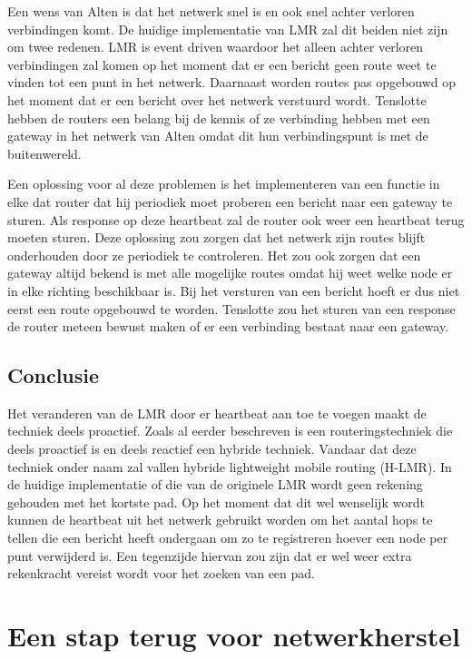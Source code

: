 \documentclass[a4paper, 11pt, oneside]{report}
\begin{document}
Een wens van Alten is dat het netwerk snel is en ook snel achter verloren verbindingen komt. 
De huidige implementatie van LMR zal dit beiden niet zijn om twee redenen.
LMR is event driven waardoor het alleen achter verloren verbindingen zal komen op het moment dat er een bericht geen route weet te vinden tot een punt in het netwerk.
Daarnaast worden routes pas opgebouwd op het moment dat er een bericht over het netwerk verstuurd wordt.
Tenslotte hebben de routers een belang bij de kennis of ze verbinding hebben met een gateway in het netwerk van Alten omdat dit hun verbindingspunt is met de buitenwereld.

Een oplossing voor al deze problemen is het implementeren van een functie in elke dat router dat hij periodiek moet proberen een bericht naar een gateway te sturen. Als response op deze heartbeat zal de router ook weer een heartbeat terug moeten sturen.
Deze oplossing zou zorgen dat het netwerk zijn routes blijft onderhouden door ze periodiek te controleren.
Het zou ook zorgen dat een gateway altijd bekend is met alle mogelijke routes omdat hij weet welke node er in elke richting beschikbaar is. Bij het versturen van een bericht hoeft er dus niet eerst een route opgebouwd te worden.
Tenslotte zou het sturen van een response de router meteen bewust maken of er een verbinding bestaat naar een gateway.

\subsection{Conclusie}  

Het veranderen van de LMR door er heartbeat aan toe te voegen maakt de techniek deels proactief. 
Zoals al eerder beschreven is een routeringstechniek die deels proactief is en deels reactief een hybride techniek.
Vandaar dat deze techniek onder naam zal vallen hybride lightweight mobile routing (H-LMR).
In de huidige implementatie of die van de originele LMR wordt geen rekening gehouden met het kortste pad.
Op het moment dat dit wel wenselijk wordt kunnen de heartbeat uit het netwerk gebruikt worden om het aantal hops te tellen die een bericht heeft ondergaan om zo te registreren hoever een node per punt verwijderd is. Een tegenzijde hiervan zou zijn dat er wel weer extra rekenkracht vereist wordt voor het zoeken van een pad.

\section{Een stap terug voor netwerkherstel}\label{sec:drone-aansturing-een-stap-terug-voor-netwerkherstel}
\end{document}
